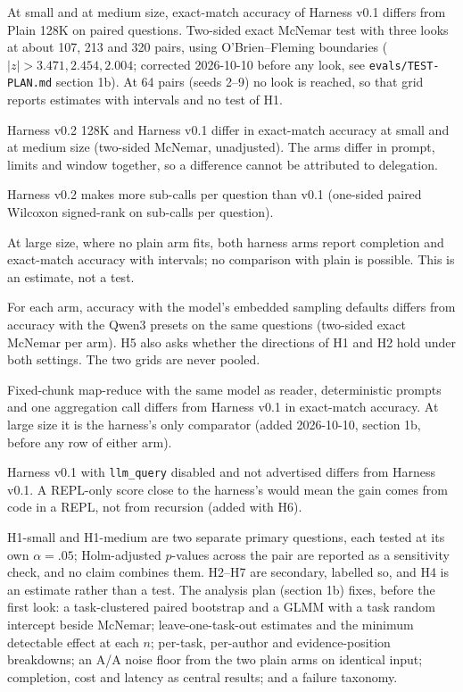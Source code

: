 \documentclass[11pt]{article}
\newcommand{\code}[1]{\texttt{#1}}
\begin{document}
\begin{description}[style=unboxed,leftmargin=1.5em,font=\normalfont\bfseries]
\item[H1 (primary; harness vs plain, within the window).] At small and at medium
  size, exact-match accuracy of Harness v0.1 differs from Plain 128K on paired
  questions. Two-sided exact McNemar test with three looks at about 107, 213 and 320
  pairs, using O'Brien--Fleming boundaries ($|z| > 3.471, 2.454, 2.004$; corrected 2026-10-10 before any look, see \code{evals/TEST-PLAN.md} section 1b). At 64 pairs
  (seeds 2--9) no look is reached, so that grid reports estimates with intervals and no
  test of H1.
\item[H2 (secondary; configuration comparison).] Harness v0.2 128K and Harness v0.1
  differ in exact-match accuracy at small and at medium size (two-sided McNemar,
  unadjusted). The arms differ in prompt, limits and window together, so a difference
  cannot be attributed to delegation.
\item[H3 (secondary; delegation).] Harness v0.2 makes more sub-calls per question than v0.1
  (one-sided paired Wilcoxon signed-rank on sub-calls per question).
\item[H4 (beyond the window).] At large size, where no plain arm fits, both
  harness arms report completion and exact-match accuracy with intervals; no
  comparison with plain is possible. This is an estimate, not a test.
\item[H5 (secondary; sampling).] For each arm, accuracy with the model's embedded sampling
  defaults differs from accuracy with the Qwen3 presets on the same questions (two-sided
  exact McNemar per arm). H5 also asks whether the directions of H1 and H2 hold under
  both settings. The two grids are never pooled.
\item[H6 (secondary; map-reduce baseline).] Fixed-chunk map-reduce with the same model as
  reader, deterministic prompts and one aggregation call differs from Harness v0.1 in
  exact-match accuracy. At large size it is the harness's only comparator (added
  2026-10-10, section 1b, before any row of either arm).
\item[H7 (secondary; REPL-only).] Harness v0.1 with \code{llm\_query} disabled and not
  advertised differs from Harness v0.1. A REPL-only score close to the harness's would
  mean the gain comes from code in a REPL, not from recursion (added with H6).
\end{description}

H1-small and H1-medium are two separate primary questions, each tested at its own
$\alpha = .05$; Holm-adjusted $p$-values across the pair are reported as a sensitivity
check, and no claim combines them. H2--H7 are secondary, labelled so, and H4 is an
estimate rather than a test. The analysis plan (section 1b) fixes, before the first look:
a task-clustered paired bootstrap and a GLMM with a task random intercept beside
McNemar; leave-one-task-out estimates and the minimum detectable effect at each $n$;
per-task, per-author and evidence-position breakdowns; an A/A noise floor from the two
plain arms on identical input; completion, cost and latency as central results; and a
failure taxonomy.
\end{document}
